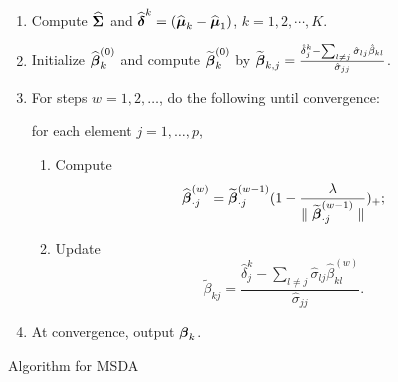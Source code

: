 \begin{algorithm}[t]
 \begin{enumerate}
  \item Compute $\widehat{\boldsymbol{\Sigma}}$ and $\widehat{\boldsymbol{\delta}}^k=(\widehat{\boldsymbol{\mu}}_k-\widehat{\boldsymbol{\mu}}_1)$, $k=1,2,\cdots, K$.
  \item Initialize $\widehat{\boldsymbol{\beta}}_k^{(0)}$ and compute $\widetilde{\boldsymbol{\beta}}_k^{(0)}$ by $\widetilde{\boldsymbol{\beta}}_{k,j}=\frac{\hat\delta_j^k-\sum_{l\neq j}\hat{\sigma}_{lj}\hat{\beta}_{kl}}{\hat{\sigma}_{jj}}$. 
  \item For steps $w=1,2,\ldots$, do the following until convergence:
  
  for each element $j=1,\ldots,p$,
  \begin{enumerate}
   \item Compute 
   \begin{equation}
   \widehat{\boldsymbol{\beta}}_{\cdot j}^{(w)}=\widetilde{\boldsymbol{\beta}}_{\cdot j}^{(w-1)}(1-\frac{\lambda}{\parallel \widetilde{\boldsymbol{\beta}}_{\cdot j}^{(w-1)}\parallel})_{+};
   \end{equation}
   \item Update
   \begin{equation}\label{algmsdaupdate}
   \tilde{\beta}_{kj}=\frac{\hat{\delta}_j^k - \sum_{l\neq j}\hat{\sigma}_{lj}\hat{\beta}_{kl}^{(w)}}{\hat{\sigma}_{jj}}.
   \end{equation}
  \end{enumerate}
  \item At convergence, output $\boldsymbol{\beta}_{k}$.
 \end{enumerate}
 \caption{\label{alg:MSDA} Algorithm for MSDA}
\end{algorithm} 


